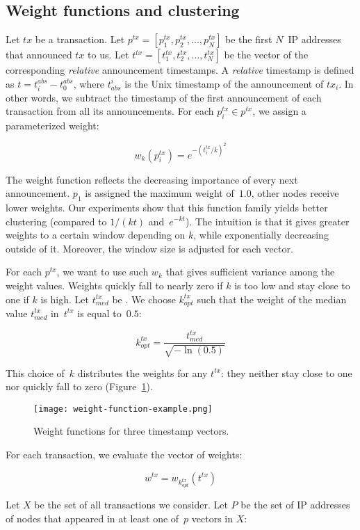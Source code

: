 \subsection{Weight functions and clustering}

Let $tx$ be a transaction.
Let $p^{tx} = [p^{tx}_1, p^{tx}_2, \dots, p^{tx}_N]$ be the first $N$~IP addresses that announced $tx$ to us.
Let $t^{tx} = [t^{tx}_1, t^{tx}_2, \dots, t^{tx}_N]$ be the vector of the corresponding \textit{relative} announcement timestamps.
A \textit{relative} timestamp is defined as $t = t^{abs}_i - t^{abs}_0$, where $t_{abs}^i$ is the Unix timestamp of the announcement of $tx_i$.
In other words, we subtract the timestamp of the first announcement of each transaction from all its announcements.
For each $p^{tx}_i \in p^{tx}$, we assign a parameterized weight:

\[
w_k(p^{tx}_i) = e^{-(t^{tx}_i/k)^2}
\]

The weight function reflects the decreasing importance of every next announcement.
$p_1$ is assigned the maximum weight of~$1.0$, other nodes receive lower weights.
Our experiments show that this function family yields better clustering (compared to $1/(kt)$ and~$e^{-kt}$).
The intuition is that it gives greater weights to a certain window depending on $k$, while exponentially decreasing outside of it.
Moreover, the window size is adjusted for each vector.

For each $p^{tx}$, we want to use such $w_k$ that gives sufficient variance among the weight values.
Weights quickly fall to nearly zero if $k$ is too low and stay close to one if $k$ is high.
Let $t^{tx}_{med}$ be .
We choose $k^{tx}_{opt}$ such that the weight of the median value $t^{tx}_{med}$ in~$t^{tx}$ is equal to~$0.5$:

\[
k^{tx}_{opt} = \frac{t^{tx}_{med}}{\sqrt{-\ln(0.5)}}
\]

This choice of~$k$ distributes the weights for any $t^{tx}$: they neither stay close to one nor quickly fall to zero (Figure~\ref{fig:weight}).

\begin{figure}
	\centering
	\texttt{[image: weight-function-example.png]}
	\caption{Weight functions for three timestamp vectors.}
	\label{fig:weight}
\end{figure}
For each transaction, we evaluate the vector of weights:

\[
w^{tx} = w_{k^{tx}_{opt}}(t^{tx})
\]

Let $X$ be the set of all transactions we consider.
Let $P$ be the set of IP addresses of nodes that appeared in at least one of~$p$ vectors in $X$:

